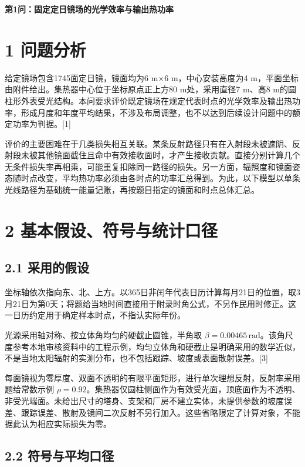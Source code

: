 \documentclass[UTF8,fontset=windows,zihao=-4]{ctexart}
\begin{document}
\begin{center}{\LARGE\bfseries 第1问：固定定日镜场的光学效率与输出热功率}\end{center}

\section*{1 问题分析}

给定镜场包含1745面定日镜，镜面均为6 m\(\times\)6 m，中心安装高度为4 m，平面坐标由附件给出。集热器中心位于坐标原点正上方80 m处，采用直径7 m、高8 m的圆柱形外表受光结构。本问要求评价既定镜场在规定代表时点的光学效率及输出热功率，形成月度和年度平均结果，不涉及布局调整，也不以达到后续设计问题中的额定功率为判据。[1]

评价的主要困难在于几类损失相互关联。某条反射路径只有在入射段未被遮阴、反射段未被其他镜面截住且命中有效接收面时，才产生接收贡献。直接分别计算几个无条件损失率再相乘，可能重复扣除同一路径的损失。另一方面，辐照度和镜面姿态随时点改变，平均热功率必须由各时点的功率汇总得到。为此，以下模型以单条光线路径为基础统一能量记账，再按题目指定的镜面和时点总体汇总。

\section*{2 基本假设、符号与统计口径}

\subsection*{2.1 采用的假设}

坐标轴依次指向东、北、上方。以365日非闰年代表日历计算每月21日的位置，取3月21日为第0天；将题给当地时间直接用于附录时角公式，不另作民用时修正。这一日历约定用于确定样本时点，不指认实际年份。

光源采用轴对称、按立体角均匀的硬截止圆锥，半角取 \(\beta=0.00465\,\mathrm{rad}\)。该角尺度参考本地审核资料中的工程示例，均匀立体角和硬截止是明确采用的数学近似，不是当地太阳辐射的实测分布，也不包括跟踪、坡度或表面散射误差。[3]

每面镜视为零厚度、双面不透明的有限平面矩形，进行单次理想反射，反射率采用题给常数示例 \(\rho=0.92\)。集热器仅圆柱侧面作为有效受光面，顶底面作为不透明、非受光端面。未给出尺寸的塔身、支架和厂房不建立实体，未提供参数的坡度误差、跟踪误差、散射及镜间二次反射不另行加入。这些省略限定了计算对象，不能据此认为相应实际损失为零。

\subsection*{2.2 符号与平均口径}
\end{document}
